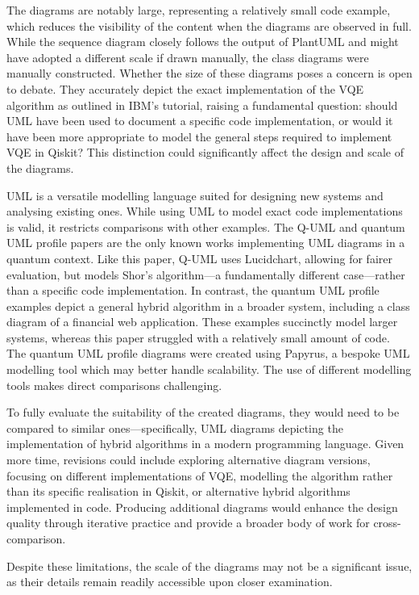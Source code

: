 \documentclass{article}
\begin{document}
The diagrams are notably large, representing a relatively small code example, which reduces the visibility of the content when the diagrams are observed in full. While the sequence diagram closely follows the output of PlantUML and might have adopted a different scale if drawn manually, the class diagrams were manually constructed. Whether the size of these diagrams poses a concern is open to debate. They accurately depict the exact implementation of the VQE algorithm as outlined in IBM's tutorial, raising a fundamental question: should UML have been used to document a specific code implementation, or would it have been more appropriate to model the general steps required to implement VQE in Qiskit? This distinction could significantly affect the design and scale of the diagrams.

UML is a versatile modelling language suited for designing new systems and analysing existing ones. While using UML to model exact code implementations is valid, it restricts comparisons with other examples. The Q-UML and quantum UML profile papers are the only known works implementing UML diagrams in a quantum context. Like this paper, Q-UML uses Lucidchart, allowing for fairer evaluation, but models Shor's algorithm—a fundamentally different case—rather than a specific code implementation. In contrast, the quantum UML profile examples depict a general hybrid algorithm in a broader system, including a class diagram of a financial web application\cite{Pérez-Castillo2022}. These examples succinctly model larger systems, whereas this paper struggled with a relatively small amount of code. The quantum UML profile diagrams were created using Papyrus, a bespoke UML modelling tool which may better handle scalability. The use of different modelling tools makes direct comparisons challenging.

To fully evaluate the suitability of the created diagrams, they would need to be compared to similar ones—specifically, UML diagrams depicting the implementation of hybrid algorithms in a modern programming language. Given more time, revisions could include exploring alternative diagram versions, focusing on different implementations of VQE, modelling the algorithm rather than its specific realisation in Qiskit, or alternative hybrid algorithms implemented in code. Producing additional diagrams would enhance the design quality through iterative practice and provide a broader body of work for cross-comparison.

Despite these limitations, the scale of the diagrams may not be a significant issue, as their details remain readily accessible upon closer examination.
\end{document}

